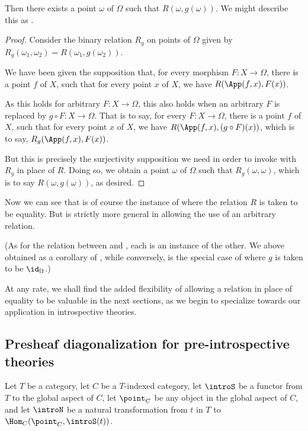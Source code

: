 Then there exists a point $\omega$ of $\Omega$ such that $R(\omega, g(\omega))$. We might describe this as .
\begin{proof}
Consider the binary relation $R_g$ on points of $\Omega$ given by $R_g(\omega_1, \omega_2) = R(\omega_1, g(\omega_2))$.

We have been given the supposition that, for every morphism $F : X \to \Omega$, there is a point $f$ of $X$, such that for every point $x$ of $X$, we have $R(\App(f, x), F(x))$.

As this holds for arbitrary $F : X \to \Omega$, this also holds when an arbitrary $F$ is replaced by $g \circ F : X \to \Omega$. That is to say, for every $F : X \to \Omega$, there is a point $f$ of $X$, such that for every point $x$ of $X$, we have $R(\App(f, x), (g \circ F)(x))$, which is to say, $R_g(\App(f, x), F(x))$.

But this is precisely the surjectivity supposition we need in order to invoke  with $R_g$ in place of $R$. Doing so, we obtain a point $\omega$ of $\Omega$ such that $R_g(\omega, \omega)$, which is to say $R(\omega, g(\omega))$, as desired.
\end{proof}

Now we can see that  is of course the instance of  where the relation $R$ is taken to be equality. But  is strictly more general in allowing the use of an arbitrary relation.

(As for the relation between  and , each is an instance of the other. We above obtained  as a corollary of , while conversely,  is the special case of  where $g$ is taken to be $\id_{\Omega}$.)

At any rate, we shall find the added flexibility of allowing a relation in place of equality to be valuable in the next sections, as we begin to specialize towards our application in introspective theories.

\subsection{Presheaf diagonalization for pre-introspective theories}
\label{PreIntrospDiag}
Let $T$ be a category, let $C$ be a $T$-indexed category, let $\introS$ be a functor from $T$ to the global aspect of $C$, let $\point_C$ be any object in the global aspect of $C$, and let $\introN$ be a natural transformation from $t$ in $T$ to $\Hom_C(\point_C, \introS(t))$.

